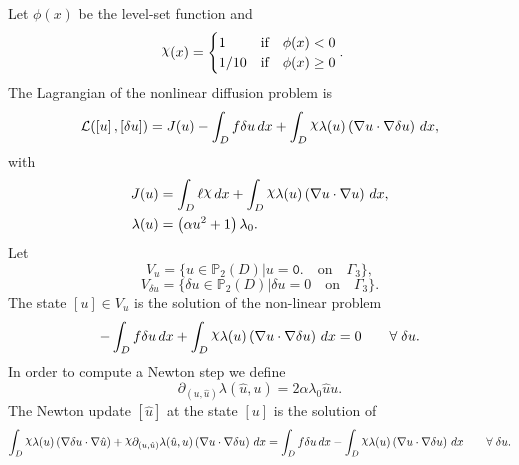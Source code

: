 \documentclass[preview]{standalone}
\let\oldcdot\cdot
\let\cdot\oldcdot
\begin{document}
Let $\phi(x)$ be the level-set function and
 \begin{align*}\raisebox{\depth}{$\chi$}(x) &= \begin{cases} 1 & \mbox{if}\quad \phi(x) < 0 \\ 1/10 & \mbox{if}\quad \phi(x)  \ge 0 \end{cases}.\end{align*}
The Lagrangian of the nonlinear diffusion problem is
\begin{dmath*}
\mathcal L(\left[ u\right],\left[ \delta u\right]) = J(u) -  \int_{D} f \delta u \,dx +  \int_{D} \raisebox{\depth}{$\chi$} \lambda(u) \left(  \nabla u  \cdot  \nabla \delta u  \right) \,dx , 
\end{dmath*}
with 
\begin{align*}
J(u) &=  \int_{D} \ell \raisebox{\depth}{$\chi$} \,dx +  \int_{D} \raisebox{\depth}{$\chi$} \lambda(u) \left(  \nabla u  \cdot  \nabla u  \right) \,dx,\\
\lambda(u) &= \left(\alpha u^{2} + 1\right) \lambda_{0}.
 \end{align*}
Let
\begin{equation*}
V_{u} = \{ u \in \mathbb P_{2}(D)| u = \mathtt{\text{0.}}  \quad \text{{on}} \quad\Gamma_{3} \},\end{equation*}
\begin{equation*}
V_{\delta u} = \{ \delta u \in \mathbb P_{2}(D)| \delta u = 0  \quad \text{{on}} \quad\Gamma_{3} \}.\end{equation*}
The state $\left[ u\right] \in  V_{u}$ is the solution of the non-linear problem
\begin{dmath*}
-  \int_{D} f \delta u \,dx +  \int_{D} \raisebox{\depth}{$\chi$} \lambda(u) \left(  \nabla u  \cdot  \nabla \delta u  \right) \,dx = 0\qquad \forall\; \delta u . 
\end{dmath*}
In order to compute a Newton step we define
\begin{dmath*}
\partial_{(u,\hat u)} \lambda(\hat u,u) = 2 \alpha \lambda_{0} \hat u u.
 \end{dmath*}
The Newton update $\left[ \hat u\right]$ at the state $\left[ u\right]$ is the solution of
\begin{dmath*}
 \int_{D} \raisebox{\depth}{$\chi$} \lambda(u) \left(  \nabla \delta u  \cdot  \nabla \hat u  \right) + \raisebox{\depth}{$\chi$} \partial_{(u,\hat u)} \lambda(\hat u,u) \left(  \nabla u  \cdot  \nabla \delta u  \right) \,dx =  \int_{D} f \delta u \,dx -  \int_{D} \raisebox{\depth}{$\chi$} \lambda(u) \left(  \nabla u  \cdot  \nabla \delta u  \right) \,dx\qquad \forall\; \delta u . 
\end{dmath*}
\end{document}
